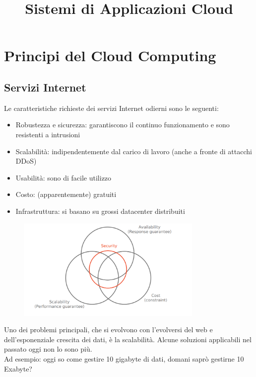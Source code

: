 \documentclass{article}
\title{Sistemi di Applicazioni Cloud}
\begin{document}
		\maketitle
		
		\section{Principi del Cloud Computing}
		
		\subsection{Servizi Internet}
		Le caratteristiche richieste dei servizi Internet odierni sono le seguenti:
		
		\begin{itemize}
		    \item Robustezza e sicurezza: garantiscono il continuo funzionamento e sono resistenti a intrusioni
		    \item Scalabilità: indipendentemente dal carico di lavoro (anche a fronte di attacchi DDoS)
		    \item Usabilità: sono di facile utilizzo
		    \item Costo: (apparentemente) gratuiti
		    \item Infrastruttura: si basano su grossi datacenter distribuiti
		\end{itemize}
		
		\begin{figure}[ht]
			\centering
			\includegraphics[width=0.8\textwidth]{SAC_01.png}
		\end{figure}
		
		Uno dei problemi principali, che si evolvono con l'evolversi del web e dell'esponenziale crescita dei dati, è la scalabilità.
		Alcune soluzioni applicabili nel passato oggi non lo sono più.\\
		Ad esempio: oggi so come gestire 10 gigabyte di dati, domani saprò gestirne 10 Exabyte?\\
		
\end{document}
